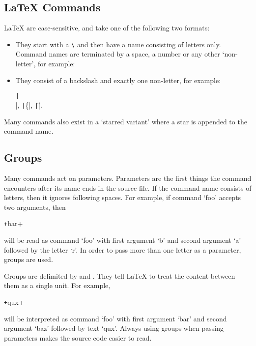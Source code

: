 \subsection{\LaTeX{} Commands}

\LaTeX{}  are case-sensitive, and take one of the following
two formats:

\begin{itemize}
  \item They start with a  \verb|\| and then have a name
        consisting of letters only. Command names are terminated by a space, a
        number or any other \enquote*{non-letter}, for example:
  \item They consist of a backslash and exactly one non-letter, for example:
        \begin{chktexignore}
          \texttt|\\|, \texttt|\{|, \texttt|\"|.
        \end{chktexignore}
\end{itemize}
Many commands also exist in a `starred variant' where a star is appended to the
command name.

\subsection{Groups}

Many commands act on parameters. Parameters are the first things the command
encounters after its name ends in the source file. If the command name consists
of letters, then it ignores following spaces. For example, if command
\enquote*{foo} accepts two arguments, then
\begin{code}
  \texttt+\foo bar+
\end{code}
will be read as command \enquote*{foo} with first argument \enquote*{b} and
second argument \enquote*{a} followed by the letter \enquote*{r}. In order to
pass more than one letter as a parameter, groups are used.

Groups are delimited by \ai{\{} and \ai{\}}. They tell \LaTeX{} to treat the
content between them as a single unit. For example,
\begin{code}
  \texttt+qux+
\end{code}
will be interpreted as command \enquote*{foo} with first argument
\enquote*{bar} and second argument \enquote*{baz} followed by text
\enquote*{qux}. Always using groups when passing parameters makes the
source code easier to read.

